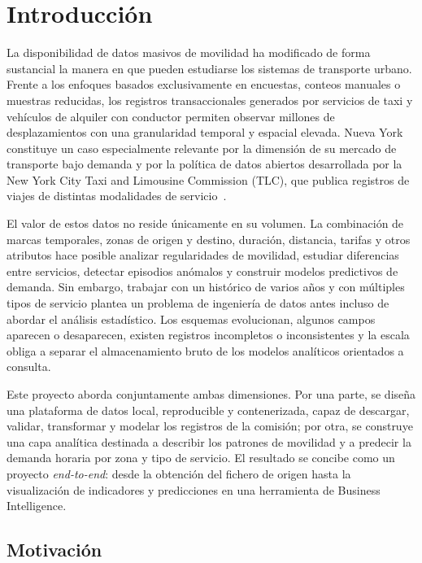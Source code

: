 \chapter{Introducción}\label{chap:introduccion}

La disponibilidad de datos masivos de movilidad ha modificado de forma sustancial la manera en que pueden estudiarse los sistemas de transporte urbano. Frente a los enfoques basados exclusivamente en encuestas, conteos manuales o muestras reducidas, los registros transaccionales generados por servicios de taxi y vehículos de alquiler con conductor permiten observar millones de desplazamientos con una granularidad temporal y espacial elevada. Nueva York constituye un caso especialmente relevante por la dimensión de su mercado de transporte bajo demanda y por la política de datos abiertos desarrollada por la New York City Taxi and Limousine Commission (TLC), que publica registros de viajes de distintas modalidades de servicio~\cite{nyctlc_tripdata,nyctlc_userguide}.

El valor de estos datos no reside únicamente en su volumen. La combinación de marcas temporales, zonas de origen y destino, duración, distancia, tarifas y otros atributos hace posible analizar regularidades de movilidad, estudiar diferencias entre servicios, detectar episodios anómalos y construir modelos predictivos de demanda. Sin embargo, trabajar con un histórico de varios años y con múltiples tipos de servicio plantea un problema de ingeniería de datos antes incluso de abordar el análisis estadístico. Los esquemas evolucionan, algunos campos aparecen o desaparecen, existen registros incompletos o inconsistentes y la escala obliga a separar el almacenamiento bruto de los modelos analíticos orientados a consulta.

Este proyecto aborda conjuntamente ambas dimensiones. Por una parte, se diseña una plataforma de datos local, reproducible y contenerizada, capaz de descargar, validar, transformar y modelar los registros de la comisión; por otra, se construye una capa analítica destinada a describir los patrones de movilidad y a predecir la demanda horaria por zona y tipo de servicio. El resultado se concibe como un proyecto \textit{end-to-end}: desde la obtención del fichero de origen hasta la visualización de indicadores y predicciones en una herramienta de Business Intelligence.

\section{Motivación}

